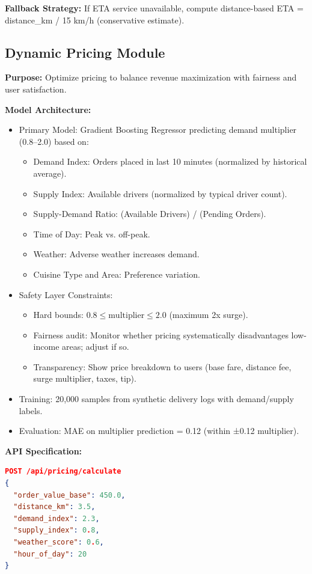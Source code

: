\documentclass[12pt,a4paper]{report}
\begin{document}
\begin{itemize}
\textbf{Fallback Strategy:} If ETA service unavailable, compute distance-based ETA = distance_km / 15 km/h (conservative estimate).

\subsection{Dynamic Pricing Module}

\textbf{Purpose:} Optimize pricing to balance revenue maximization with fairness and user satisfaction.

\textbf{Model Architecture:}
\begin{itemize}
    \item Primary Model: Gradient Boosting Regressor predicting demand multiplier (0.8--2.0) based on:
    \begin{itemize}
        \item Demand Index: Orders placed in last 10 minutes (normalized by historical average).
        \item Supply Index: Available drivers (normalized by typical driver count).
        \item Supply-Demand Ratio: (Available Drivers) / (Pending Orders).
        \item Time of Day: Peak vs. off-peak.
        \item Weather: Adverse weather increases demand.
        \item Cuisine Type and Area: Preference variation.
    \end{itemize}
    \item Safety Layer Constraints:
    \begin{itemize}
        \item Hard bounds: $0.8 \le \text{multiplier} \le 2.0$ (maximum 2x surge).
        \item Fairness audit: Monitor whether pricing systematically disadvantages low-income areas; adjust if so.
        \item Transparency: Show price breakdown to users (base fare, distance fee, surge multiplier, taxes, tip).
    \end{itemize}
    \item Training: 20,000 samples from synthetic delivery logs with demand/supply labels.
    \item Evaluation: MAE on multiplier prediction = 0.12 (within ±0.12 multiplier).
\end{itemize}

\textbf{API Specification:}
\begin{lstlisting}[language=json, caption={Dynamic Pricing Endpoint}]
POST /api/pricing/calculate
{
  "order_value_base": 450.0,
  "distance_km": 3.5,
  "demand_index": 2.3,
  "supply_index": 0.8,
  "weather_score": 0.6,
  "hour_of_day": 20
}


\end{lstlisting}
\end{itemize}
\end{document}

